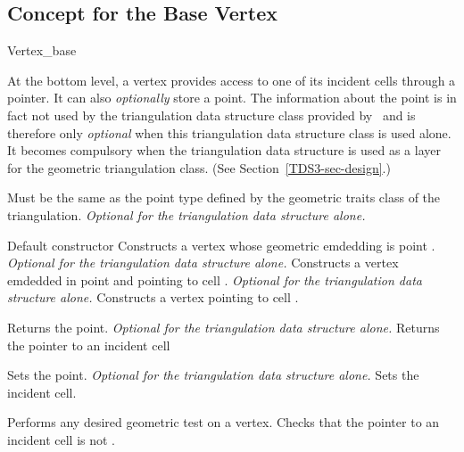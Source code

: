 	\subsection{Concept for the Base Vertex}
	\begin{ccClass}{Vertex_base}

At the bottom level, a vertex provides access to
one of its incident cells through a  pointer. 
It can also \textit{optionally} store a point. The
information about the point is in fact not used by the triangulation
data structure class provided by \cgal\ and is therefore only
\textit{optional} when this triangulation data structure class is used
alone. It becomes compulsory when the 
triangulation data structure is used as a layer for the geometric
triangulation class. (See Section~\ref{TDS3-sec-design}.)

\ccTypes
{}
{Must be the same as the point type  defined by the
geometric traits class of the triangulation. {\textit{Optional for the
triangulation data structure alone.}}} 

\ccCreation

{Default constructor}
\ccGlue
{}
{Constructs a vertex whose geometric emdedding is point
. {\textit{Optional for the triangulation data structure
alone.}}} 
\ccGlue
{}
{Constructs a vertex emdedded in point  and pointing to cell
. {\textit{Optional for the triangulation data structure alone.}}}
\ccGlue
{}
{Constructs a vertex pointing to cell .}

\ccAccessFunctions

{Returns the point. {\textit{Optional for the triangulation data
structure alone.}}} 
\ccGlue
{}
{Returns the pointer to an incident cell}


{Sets the point. {\textit{Optional for the triangulation data
structure alone.}}} 
\ccGlue
{}
{Sets the incident cell.}

{Performs any desired geometric test on a vertex. Checks that the
pointer to an incident cell is not .}


\end{ccClass}
